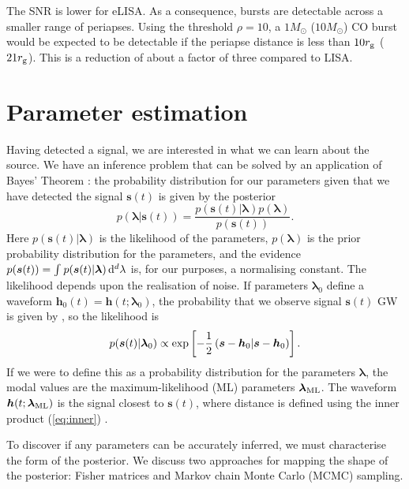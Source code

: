 The SNR is lower for eLISA. As a consequence, bursts are detectable across a smaller range of periapses. Using the threshold $\rho = 10$, a $1 M_\odot$ ($10 M_\odot$) CO burst would be expected to be detectable if the periapse distance is less than $10 r_\mathrm{g}$ ($21 r_\mathrm{g}$). This is a reduction of about a factor of three compared to LISA.

\section{Parameter estimation}\label{sec:Estimation}

Having detected a signal, we are interested in what we can learn about the source. We have an inference problem that can be solved by an application of Bayes' Theorem \citep[chapter 4]{Jaynes2003}: the probability distribution for our parameters given that we have detected the signal $\boldsymbol{s}(t)$ is given by the posterior
\begin{equation}
p(\boldsymbol{\lambda}|\boldsymbol{s}(t)) = \dfrac{p(\boldsymbol{s}(t)|\boldsymbol{\lambda})p(\boldsymbol{\lambda})}{p(\boldsymbol{s}(t))}.
\end{equation}
Here $p(\boldsymbol{s}(t)|\boldsymbol{\lambda})$ is the likelihood of the parameters, $p(\boldsymbol{\lambda})$ is the prior probability distribution for the parameters, and the evidence $p(\boldsymbol{s}(t)) = \int_{}^{}{p(\boldsymbol{s}(t)|\boldsymbol{\lambda})}\,\mathrm{d}{^d \lambda}$ is, for our purposes, a normalising constant. The likelihood depends upon the realisation of noise. If parameters $\boldsymbol{\lambda}_0$ define a waveform $\boldsymbol{h}_0(t) = \boldsymbol{h}(t; \boldsymbol{\lambda}_0)$, the probability that we observe signal $\boldsymbol{s}(t)$ GW is given by , so the likelihood is
\begin{equation}
p(\boldsymbol{s}(t)|\boldsymbol{\lambda}_0) \propto \exp\left[-\dfrac{1}{2}\left({\boldsymbol{s}-\boldsymbol{h}_0}\middle|{\boldsymbol{s}-\boldsymbol{h}_0}\right)\right].
\label{eq:likelihood}
\end{equation}
If we were to define this as a probability distribution for the parameters $\boldsymbol{\lambda}$, the modal values are the maximum-likelihood (ML) parameters $\boldsymbol{\lambda}_\mathrm{ML}$. The waveform $\boldsymbol{h}(t; \boldsymbol{\lambda}_\mathrm{ML})$ is the signal closest to $\boldsymbol{s}(t)$, where distance is defined using the inner product (\ref{eq:inner}) \citep{Cutler1994}.

To discover if any parameters can be accurately inferred, we must characterise the form of the posterior. We discuss two approaches for mapping the shape of the posterior: Fisher matrices and Markov chain Monte Carlo (MCMC) sampling.

